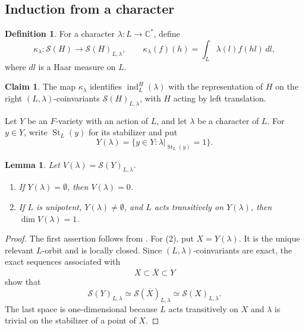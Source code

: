 \documentclass[11pt,a4paper,twoside]{amsart}
\newtheorem{lemma}[theorem]{Lemma}
\theoremstyle{definition}
\newtheorem{definition}[theorem]{Definition}
\newtheorem{claim}[theorem]{Claim}
\theoremstyle{remark}
\newcommand{\bl}{\lambda}
\newcommand{\kk}{\kappa}
\newcommand{\mcS}{\mathcal S}
\newcommand{\CC}{\mathbb C}
\newcommand{\emp}{\emptyset}
\newcommand{\ind}{\operatorname{ind}}
\newcommand{\St}{\operatorname{St}}
\begin{document}
\subsection{Induction from a character}
\begin{definition}
For a character $\bl:L\to\CC^*$, define
$$
\kk_\bl:\mcS(H)\longrightarrow\mcS(H)_{L,\bl},\qquad
\kk_\bl(f)(h)=\int_L\bl(l)f(hl)\,dl,
$$
where $dl$ is a Haar measure on $L$.
\end{definition}
\begin{claim}
The map $\kk_\bl$ identifies $\ind_L^H(\bl)$ with the representation of $H$ on the right $(L,\bl)$-coinvariants $\mcS(H)_{L,\bl}$, with $H$ acting by left translation.
\end{claim}
Let $Y$ be an $F$-variety with an action of $L$, and let $\bl$ be a character of $L$. For $y\in Y$, write $\St_L(y)$ for its stabilizer and put
$$
Y(\bl)=\{y\in Y:\bl|_{\St_L(y)}=1\}.
$$
\begin{lemma}\label{relevant-orbit}
Let $V(\bl)=\mcS(Y)_{L,\bl}$.
\begin{enumerate}
\item If $Y(\bl)=\emp$, then $V(\bl)=0$.
\item If $L$ is unipotent, $Y(\bl)\neq\emp$, and $L$ acts transitively on $Y(\bl)$, then $\dim V(\bl)=1$.
\end{enumerate}
\end{lemma}
\begin{proof}
The first assertion follows from \cite[Section~6, Theorems~6.9 and A]{BZ}. For (2), put $X=Y(\bl)$. It is the unique relevant $L$-orbit and is locally closed. Since $(L,\bl)$-coinvariants are exact, the exact sequences associated with
$$
X\subset\overline X\subset Y
$$
show that
$$
\mcS(Y)_{L,\bl}\simeq\mcS(\overline X)_{L,\bl}\simeq\mcS(X)_{L,\bl}.
$$
The last space is one-dimensional because $L$ acts transitively on $X$ and $\bl$ is trivial on the stabilizer of a point of $X$.
\end{proof}
\end{document}
